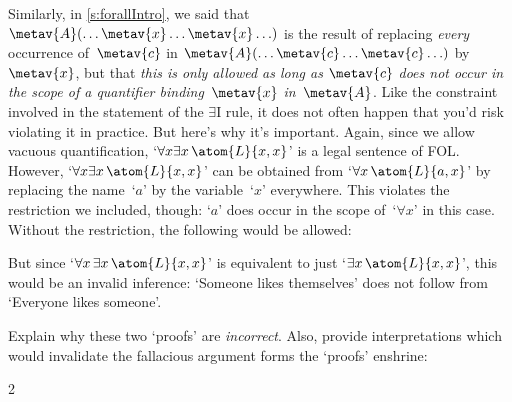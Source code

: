 Similarly, in \cref{s:forallIntro}, we said that $\metav{A}(\ldots
\metav{x} \ldots \metav{x}\ldots)$ is the result of replacing
\emph{every} occurrence of~$\metav{c}$ in $\metav{A}(\ldots \metav{c}
\ldots \metav{c}\ldots)$ by~$\metav{x}$, but that \emph{this is only
allowed as long as $\metav{c}$ does not occur in the scope of a
quantifier binding~$\metav{x}$ in~$\metav{A}$}. Like the constraint
involved in the statement of the $\exists$I rule, it does not often
happen that you'd risk violating it in practice. But here's why it's
important. Again, since we allow vacuous quantification, `$\forall
x\exists x\,\atom{L}{x,x}$' is a legal sentence of FOL. However,
`$\forall x\exists x\,\atom{L}{x,x}$' can be obtained from `$\forall
x\,\atom{L}{a,x}$' by replacing the name~`$a$' by the variable~`$x$'
everywhere. This violates the restriction we included, though: `$a$'
does occur in the scope of~`$\forall x$' in this case. Without the
restriction, the following would be allowed:
\begin{fitchproof}
	\PR
\ifHTMLtarget
\else
{}
\fi
\end{fitchproof}
But since `$\forall x\, \exists x\, \atom{L}{x,x}$' is equivalent to
just `$\exists x\, \atom{L}{x,x}$', this would be an invalid
inference: `Someone likes themselves' does not follow from `Everyone
likes someone'.

\practiceproblems
\problempart
Explain why these two `proofs' are \emph{incorrect}. Also, provide interpretations which would invalidate the fallacious argument forms the `proofs' enshrine:
\begin{multicols}{2}
	\begin{fitchproof}
		\PR
	\end{fitchproof}
	\begin{fitchproof}
		\hypo{AE}{\forall x\, \exists y\, \atom{R}{x,y}}\PR
		\Ae{AE}
		\open
			\hypo{ass}{\atom{R}{a,a}}\AS
			\Ei{ass}
		\close
		\Ee{E, ass-Ex}
	\end{fitchproof}
\end{multicols}

